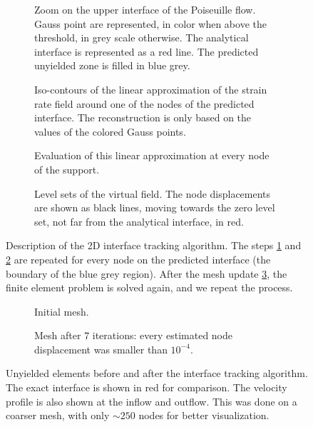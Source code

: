 \documentclass[11 pt]{report}
\begin{document}
\vfill
\begin{figure}[H]
    \centering
    \begin{subfigure}[t]{0.48\textwidth}
        
        \caption{Zoom on the upper interface of the Poiseuille flow. Gauss point are represented, in color when above the threshold, in grey scale otherwise. The analytical interface is represented as a red line. The predicted unyielded zone is filled in blue grey.}
    \end{subfigure}\hfill
    \begin{subfigure}[t]{0.48\textwidth}
        
        \caption{Iso-contours of the linear approximation of the strain rate field around one of the nodes of the predicted interface. The reconstruction is only based on the values of the colored Gauss points.}
        \label{fig:build_approx}
    \end{subfigure}\vspace{20pt}
    \begin{subfigure}[t]{0.48\textwidth}
        
        \caption{Evaluation of this linear approximation at every node of the support.}
        \label{fig:eval_approx}
    \end{subfigure}\hfill
    \begin{subfigure}[t]{0.48\textwidth}
        
        \caption{Level sets of the virtual field. The node displacements are shown as black lines, moving towards the zero level set, not far from the analytical interface, in red.}
        \label{fig:targets}
    \end{subfigure}
    \caption{Description of the 2D interface tracking algorithm. The steps \ref{fig:build_approx} and \ref{fig:eval_approx} are repeated for every node on the predicted interface (the boundary of the blue grey region). After the mesh update \ref{fig:targets}, the finite element problem is solved again, and we repeat the process.}
    \label{fig:rec2d_a}
\end{figure}
\vfill

\begin{figure}[H]
    \centering
    \begin{subfigure}[t]{\textwidth}
        
        \caption{Initial mesh.}
    \end{subfigure}
    \begin{subfigure}[t]{\textwidth}
        
        \caption{Mesh after $7$ iterations: every estimated node displacement was smaller than $10^{-4}$.}
    \end{subfigure}
    \caption{Unyielded elements before and after the interface tracking algorithm. The exact interface is shown in red for comparison. The velocity profile is also shown at the inflow and outflow. This was done on a coarser mesh, with only $\sim 250$ nodes for better visualization.}
    \label{fig:rec2d_b}
\end{figure}
\end{document}
